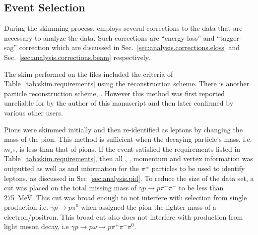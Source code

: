 \subsection{\label{sec:analysis.event_selection}Event Selection}

During the skimming process,  employs several corrections to the data that are necessary to analyze the data. Such corrections are ``energy-loss'' and ``tagger-sag'' correction which are discussed in Sec.~\ref{sec:analysis.corrections.eloss} and Sec.~\ref{sec:analysis.corrections.beam} respectively. 

The skim performed on the  files included the criteria of Table~\ref{tab:skim.requirements} using the  reconstruction scheme. There is another particle reconstruction scheme, . However this method was first reported unreliable for  by the author of this manuscript and then later confirmed by various other users.

Pions were skimmed initially and then re-identified as leptons by changing the mass of the pion. This method is sufficient when the decaying particle's mass, i.e. $m_{\pi^0}$, is less than that of pions. If the event satisfied the requirements listed in Table~\ref{tab:skim.requirements}, then all , , momentum and vertex information was outputted as well as  and  information for the $\pi^{\pm}$ particles to be used to identify leptons, as discussed in Sec~\ref{sec:analysis.pid}. To reduce the size of the data set, a cut was placed on the total missing mass of $\gamma p \to p \pi^{+} \pi^{-}$ to be less than 275~MeV. This cut was broad enough to not interfere with \piz selection from single \piz production i.e. $\gamma p \to p \pi^{0}$ when assigned the pion the lighter mass of a electron/positron. This broad cut also does not interfere with \piz production from light meson decay, i.e $\gamma p \to p \omega \to p \pi^{+} \pi^{-} \pi^{0}$.

